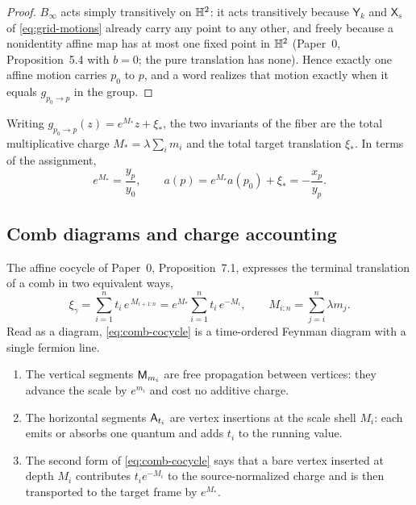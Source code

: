 \begin{proof}
$B_\infty$ acts simply transitively on $\mathbb{H}^2$: it acts transitively because
$\mathsf Y_k$ and $\mathsf X_s$ of \eqref{eq:grid-motions} already carry any
point to any other, and freely because a nonidentity affine map has at most one
fixed point in $\mathbb{H}^2$ (Paper~0, Proposition~5.4 with $b=0$; the pure
translation has none).  Hence exactly one affine motion carries $p_0$ to $p$,
and a word realizes that motion exactly when it equals $g_{p_0\to p}$ in the
group.
\end{proof}

Writing $g_{p_0\to p}(z)=e^{M_*}z+\xi_*$, the two invariants of the fiber are the
total multiplicative charge $M_*=\lambda\sum_i m_i$ and the total target
translation $\xi_*$.  In terms of the assignment,
\begin{equation}\label{eq:fiber-invariants}
  e^{M_*} = \frac{y_p}{y_0},
  \qquad
  a(p)=e^{M_*}a(p_0)+\xi_* = -\frac{x_p}{y_p}.
\end{equation}

\subsection{Comb diagrams and charge accounting}

The affine cocycle of Paper~0, Proposition~7.1, expresses the terminal
translation of a comb in two equivalent ways,
\begin{equation}\label{eq:comb-cocycle}
  \xi_\gamma=\sum_{i=1}^{n}t_i\,e^{\,M_{i+1:n}}
  = e^{M_*}\sum_{i=1}^{n}t_i\,e^{-M_i},
  \qquad M_{i:n}=\sum_{j=i}^{n}\lambda m_j .
\end{equation}
Read as a diagram, \eqref{eq:comb-cocycle} is a time-ordered Feynman diagram
with a single fermion line.

\begin{enumerate}[label=(\alph*)]
  \item The vertical segments $\mathsf M_{m_i}$ are free propagation between
  vertices: they advance the scale by $e^{m_i}$ and cost no additive charge.
  \item The horizontal segments $\mathsf A_{t_i}$ are vertex insertions at the scale
  shell $M_i$: each emits or absorbs one quantum and adds $t_i$ to the running
  value.
  \item The second form of \eqref{eq:comb-cocycle} says that a bare vertex
  inserted at depth $M_i$ contributes $t_ie^{-M_i}$ to the source-normalized
  charge and is then transported to the target frame by $e^{M_*}$.
\end{enumerate}

